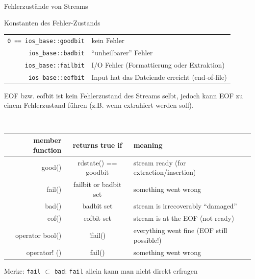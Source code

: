 \begin{frame}{Fehlerzustände von Streams}
	\footnotesize
	\begin{block}{Konstanten des Fehler-Zustands}
		\begin{tabular}{rl}
			\texttt{0 == ios\_base::goodbit}	&	kein Fehler	\\
			\texttt{ios\_base::badbit}			&	\enquote{unheilbarer} Fehler	\\
			\texttt{ios\_base::failbit}		&	I/O Fehler (Formattierung oder Extraktion)	\\
			\texttt{ios\_base::eofbit}			&	Input hat das Dateiende erreicht (end-of-file)	\\
		\end{tabular}
	\end{block}
	
	\pause
	
	EOF bzw. eofbit ist kein Fehlerzustand des Streams selbt, jedoch kann EOF zu einem Fehlerzustand führen (z.B. wenn extrahiert werden soll).
	
	\vspace{1em}
	
	{\tt
	\begin{tabular}{rcl}
		\textnormal{\textbf{member function}}	&	\textnormal{\textbf{returns true if}}&	\textnormal{\textbf{meaning}}\\
		\hline
		good()	&	rdstate() == goodbit	&	\textnormal{stream ready (for extraction/insertion)}	\\
		fail()	&	failbit \textnormal{or} badbit \textnormal{set}	&	\textnormal{something went wrong}	\\
		bad()	&	badbit \textnormal{set}	&	\textnormal{stream is irrecoverably \enquote{damaged}} \\
		eof()	&	eofbit \textnormal{set}	&	\textnormal{stream is at the EOF (not ready)}	\\
		operator bool()	&	!fail()	&	\textnormal{everything went fine (EOF still possible!)} \\
		operator! ()	&	fail()	&	\textnormal{something went wrong} \\
	\end{tabular}
	}
	
	\pause
	\vspace{1em}
	
	Merke: \texttt{fail} $\subset$ \texttt{bad}: \texttt{fail} allein kann man nicht direkt erfragen
\end{frame}

